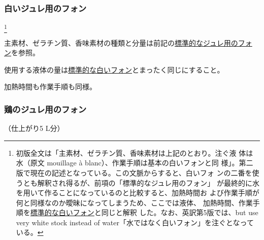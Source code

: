 \begin{recette}
\maeaki

\hypertarget{fonds-pour-gelee-blanche}{%
\subsubsection{白いジュレ用のフォン}\label{fonds-pour-gelee-blanche}}

\footnote{初版全文は「主素材、ゼラチン質、香味素材は上記のとおり。注ぐ液
  体は水（原文 mouillage à blanc）、作業手順は基本の白いフォンと同
  様」。第二版で現在の記述となっている。この文脈からすると、白いフォ
  ンの二番を使うとも解釈され得るが、前項の「標準的なジュレ用のフォン」
  が最終的に水を用いて作ることになっているのと比較すると、加熱時間お
  よび作業手順が何と同様なのか曖昧になってしまうため、ここでは液体、
  加熱時間、作業手順を\protect\hyperlink{fonds-blanc}{標準的な白いフォン}と同じと解釈
  した。なお、英訳第5版では、but use very white stock instead of
  water「水ではなく白いフォン」を注ぐとなっている。}


主素材、ゼラチン質、香味素材の種類と分量は前記の\protect\hyperlink{fonds-pour-gelee-ordinaire}{標準的なジュレ用のフォ
ン}を参照。

使用する液体の量は\protect\hyperlink{fonds-blanc}{標準的な白いフォン}とまったく同じにすること。

加熱時間も作業手順も同様。

\maeaki

\hypertarget{fonds-pour-gelee-de-volaille}{%
\subsubsection{鶏のジュレ用のフォン}\label{fonds-pour-gelee-de-volaille}}



（仕上がり5 L分）


\end{recette}
